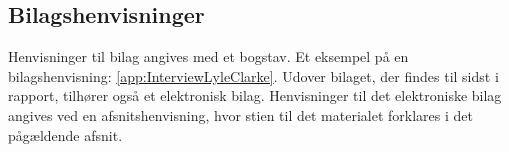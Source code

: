 \subsection*{Bilagshenvisninger}
Henvisninger til bilag angives med et bogstav. Et eksempel på en bilagshenvisning: \autoref{app:InterviewLyleClarke}. Udover bilaget, der findes til sidst i rapport, tilhører også et elektronisk bilag. Henvisninger til det elektroniske bilag angives ved en afsnitshenvisning, hvor stien til det materialet forklares i det pågældende afsnit. 
%
%
